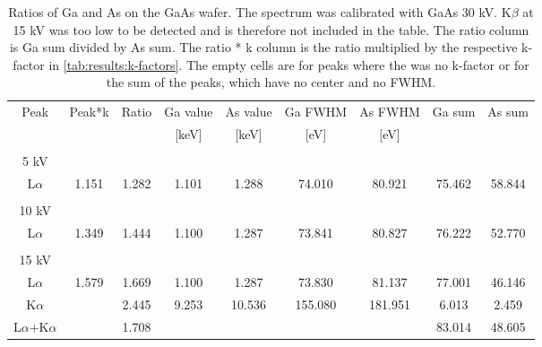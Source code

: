 \begin{table}[ht]
    \centering
    \caption{
        Ratios of Ga and As on the GaAs wafer.
        The spectrum was calibrated with GaAs 30 kV.
        K$\beta$ at 15 kV was too low to be detected and is therefore not included in the table.
        The ratio column is Ga sum divided by As sum.
        The ratio * k column is the ratio multiplied by the respective k-factor in \cref{tab:results:k-factors}.
        The empty cells are for peaks where the was no k-factor or for the sum of the peaks, which have no center and no FWHM.
    }
    \label{tab:results:ratios}
    \begin{tabular}{ccccccccc}

        Peak                         & Peak*k & Ratio & Ga value & As value & Ga FWHM & As FWHM & Ga sum  & As sum \\
                                     &        &       & [keV]    & [keV]    & [eV]    & [eV]    &         &        \\
        \hline
                                     &        &       &          &          &         &         &         &        \\

        5 kV                         &        &       &          &          &         &         &         &        \\
        L$\alpha$                    & 1.151  & 1.282 & 1.101    & 1.288    & 74.010  & 80.921  & 75.462  & 58.844 \\
        \hline
                                     &        &       &          &          &         &         &         &        \\
        10 kV                        &        &       &          &          &         &         &         &        \\
        L$\alpha$                    & 1.349  & 1.444 & 1.100    & 1.287    & 73.841  & 80.827  & 76.222  & 52.770 \\

        \hline
                                     &        &       &          &          &         &         &         &        \\
        15 kV                        &        &       &          &          &         &         &         &        \\
        L$\alpha$                    & 1.579  & 1.669 & 1.100    & 1.287    & 73.830  & 81.137  & 77.001  & 46.146 \\
        K$\alpha$                    &        & 2.445 & 9.253    & 10.536   & 155.080 & 181.951 & 6.013   & 2.459  \\
        L$\alpha$+K$\alpha$          &        & 1.708 &          &          &         &         & 83.014  & 48.605 \\


\end{tabular}
\end{table}
